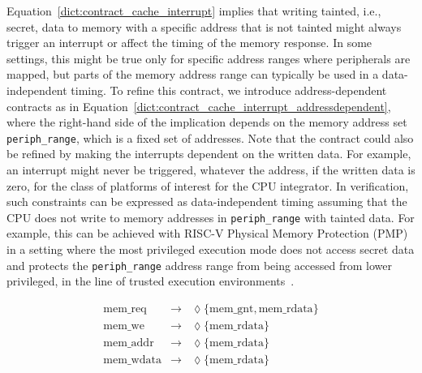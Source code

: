 Equation~\ref{dict:contract_cache_interrupt} implies that writing tainted, i.e., secret, data to memory with a specific address that is not tainted might always trigger an interrupt or affect the timing of the memory response. In some settings, this might be true only for specific address ranges where peripherals are mapped, but parts of the memory address range can typically be used in a data-independent timing.
To refine this contract, we introduce address-dependent contracts as in Equation~\ref{dict:contract_cache_interrupt_addressdependent}, where the right-hand side of the implication depends on the memory address set \texttt{periph\_range}, which is a fixed set of addresses.
Note that the contract could also be refined by making the interrupts dependent on the written data. For example, an interrupt might never be triggered, whatever the address, if the written data is zero, for the class of platforms of interest for the CPU integrator.
In verification, such constraints can be expressed as data-independent timing assuming that the CPU does not write to memory addresses in \texttt{periph\_range} with tainted data.
For example, this can be achieved with RISC-V Physical Memory Protection (PMP)~\cite{riscv_privileged} in a setting where the most privileged execution mode does not access secret data and protects the \texttt{periph\_range} address range from being accessed from lower privileged, in the line of trusted execution environments~\cite{lee2019keystone,costan2016sanctum,mckeen2013intel,arm2009trustzone,nasahl2020hector,mcgillion2015opentee,lebedev2018sanctorum,schneider2022sok,bourgeat2018mi6,brasser2022tcx}.


\begin{equation}
\label{dict:contract_nocache}
\begin{array}{rcl}
\text{mem\_req} & \rightarrow & \lozenge \{ \text{mem\_gnt}, \text{mem\_rdata}\} \\
\text{mem\_we} & \rightarrow & \lozenge \{\text{mem\_rdata}\} \\
\text{mem\_addr} & \rightarrow & \lozenge \{ \text{mem\_rdata}\} \\
\text{mem\_wdata} & \rightarrow & \lozenge \{ \text{mem\_rdata} \} \\
\end{array}
\end{equation}

